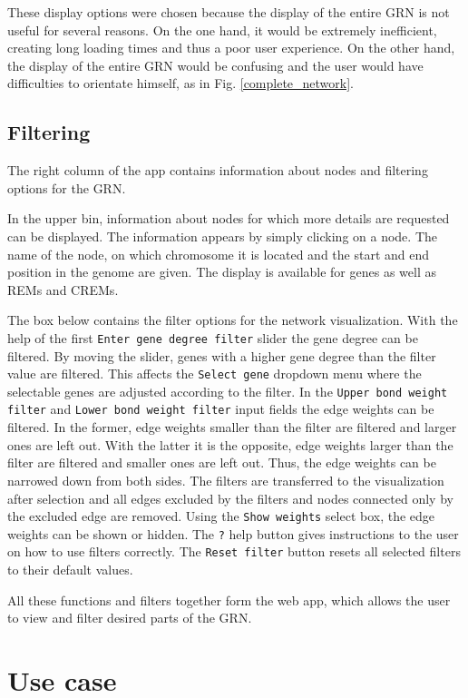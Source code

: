 \documentclass[pdftex,12pt,a4paper]{report}
\begin{document}
These display options were chosen because the display of the entire GRN is not useful for several reasons. On the one hand, it would be extremely inefficient, creating long loading times and thus a poor user experience. On the other hand, the display of the entire GRN would be confusing and the user would have difficulties to orientate himself, as in Fig. \ref{complete_network}. 

\subsection{Filtering}
The right column of the app contains information about nodes and filtering options for the GRN. 

In the upper bin, information about nodes for which more details are requested can be displayed. The information appears by simply clicking on a node. The name of the node, on which chromosome it is located and the start and end position in the genome are given. The display is available for genes as well as REMs and CREMs. 

The box below contains the filter options for the network visualization. With the help of the first \texttt{Enter gene degree filter} slider the gene degree can be filtered. By moving the slider, genes with a higher gene degree than the filter value are filtered. This affects the \texttt{Select gene} dropdown menu where the selectable genes are adjusted according to the filter. In the \texttt{Upper bond weight filter} and \texttt{Lower bond weight filter} input fields the edge weights can be filtered. In the former, edge weights smaller than the filter are filtered and larger ones are left out. With the latter it is the opposite, edge weights larger than the filter are filtered and smaller ones are left out. Thus, the edge weights can be narrowed down from both sides. The filters are transferred to the visualization after selection and all edges excluded by the filters and nodes connected only by the excluded edge are removed. Using the \texttt{Show weights} select box, the edge weights can be shown or hidden. The \texttt{?} help button gives instructions to the user on how to use filters correctly. The \texttt{Reset filter} button resets all selected filters to their default values. 

All these functions and filters together form the web app, which allows the user to view and filter desired parts of the GRN.  
\section{Use case}
\end{document}
